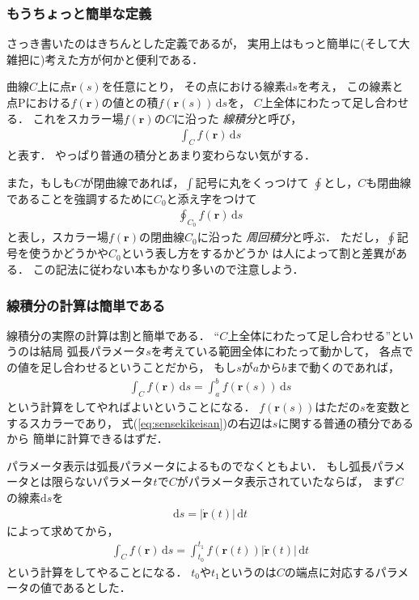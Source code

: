 \subsubsection{もうちょっと簡単な定義}
さっき書いたのはきちんとした定義であるが，
実用上はもっと簡単に(そして大雑把に)考えた方が何かと便利である．

曲線$C$上に点$\bm{r}(s)$を任意にとり，
その点における線素$\mathrm{d}s$を考え，
この線素と点Pにおける$f(\bm{r})$の値との積$f(\bm{r}(s)) \, \mathrm{d} s $を，
$C$上全体にわたって足し合わせる．
これをスカラー場$f(\bm{r})$の$C$に沿った
\emph{線積分}と呼び，
\begin{align*}
\int_C f( \bm{r} ) \, \mathrm{d}s
\end{align*}
と表す．
やっぱり普通の積分とあまり変わらない気がする．

また，もしも$C$が閉曲線であれば，$\int$記号に丸をくっつけて
$\oint$とし，$C$も閉曲線であることを強調するために$C_0$と添え字をつけて
\begin{align*}
\oint_{C_0} f( \bm{r} ) \, \mathrm{d} s
\end{align*}
と表し，スカラー場$f(\bm{r})$の閉曲線$C_0$に沿った
\emph{周回積分}と呼ぶ．
ただし，$\oint$記号を使うかどうかや$C_0$という表し方をするかどうか
は人によって割と差異がある．
この記法に従わない本もかなり多いので注意しよう．

\subsubsection{線積分の計算は簡単である}
線積分の実際の計算は割と簡単である．
``$C$上全体にわたって足し合わせる''というのは結局
弧長パラメータ$s$を考えている範囲全体にわたって動かして，
各点での値を足し合わせるということだから，
もし$s$が$a$から$b$まで動くのであれば，
\begin{align}
\int_C f(\bm{r} ) \, \mathrm{d}s = \int _a^b f(\bm{r} (s) ) \, \mathrm{d} s
\label{eq:sensekikeisan}
\end{align}
という計算をしてやればよいということになる．
$f(\bm{r}(s))$はただの$s$を変数とするスカラーであり，
式(\ref{eq:sensekikeisan})の右辺は$s$に関する普通の積分であるから
簡単に計算できるはずだ．

パラメータ表示は弧長パラメータによるものでなくともよい．
もし弧長パラメータとは限らないパラメータ$t$で$C$がパラメータ表示されていたならば，
まず$C$の線素$\mathrm{d}s$を
\begin{align}
\mathrm{d} s = \lvert \dot {\bm{r} } (t) \rvert  \, \mathrm{d} t
\label{eq:sensopara}
\end{align}
によって求めてから，
\begin{align}
\int_C f(\bm{r} ) \, \mathrm{d} s 
= \int_{t_0}^{t_1} f(\bm{r}(t) )\lvert \dot{ \bm{r} } (t) \rvert \, \mathrm{d} t
\label{eq:sensekibunpara}
\end{align}
という計算をしてやることになる．
$t_0$や$t_1$というのは$C$の端点に対応するパラメータの値であるとした．


